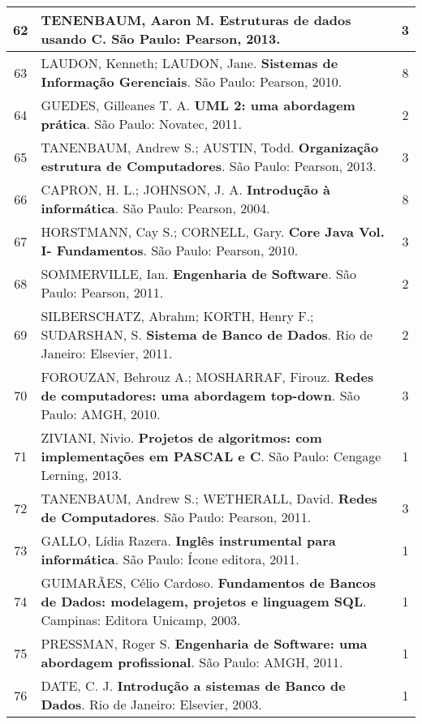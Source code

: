 \begin{longtable}{|c|p{115mm}|c|}
62     & TENENBAUM, Aaron M. \textbf{Estruturas de dados usando C}. São Paulo: Pearson, 2013.  & 3          \\ \hline
63     & LAUDON, Kenneth; LAUDON, Jane. \textbf{Sistemas de Informação Gerenciais}. São Paulo: Pearson, 2010. & 8 \\ \hline
64     & GUEDES, Gilleanes T. A. \textbf{UML 2: uma abordagem prática}. São Paulo: Novatec, 2011. & 2          \\ \hline
65     & TANENBAUM, Andrew S.; AUSTIN, Todd. \textbf{Organização estrutura de Computadores}. São Paulo: Pearson, 2013. & 3          \\ \hline
66     & CAPRON, H. L.; JOHNSON, J. A. \textbf{Introdução à informática}. São Paulo: Pearson, 2004.     & 8          \\ \hline
67     & HORSTMANN, Cay S.; CORNELL, Gary. \textbf{Core Java Vol. I- Fundamentos}. São Paulo: Pearson, 2010. & 3          \\ \hline
68     & SOMMERVILLE, Ian. \textbf{Engenharia de Software}. São Paulo: Pearson, 2011.                   & 2          \\ \hline
69     & SILBERSCHATZ, Abrahm; KORTH, Henry F.; SUDARSHAN, S. \textbf{Sistema de Banco de Dados}. Rio de Janeiro: Elsevier, 2011. & 2          \\ \hline
70     & FOROUZAN, Behrouz A.; MOSHARRAF, Firouz. \textbf{Redes de computadores: uma abordagem top-down}. São Paulo: AMGH, 2010. & 3          \\ \hline
71     & ZIVIANI, Nivio. \textbf{Projetos de algoritmos: com implementações em PASCAL e C}. São Paulo: Cengage Lerning, 2013. & 1          \\ \hline
72     & TANENBAUM, Andrew S.; WETHERALL, David. \textbf{Redes de Computadores}. São Paulo: Pearson, 2011. & 3          \\ \hline
73     & GALLO, Lídia Razera. \textbf{Inglês instrumental para informática}. São Paulo: Ícone editora, 2011. & 1          \\ \hline
74     & GUIMARÃES, Célio Cardoso. \textbf{Fundamentos de Bancos de Dados: modelagem, projetos e linguagem SQL}. Campinas: Editora Unicamp, 2003. & 1          \\ \hline
75     & PRESSMAN, Roger S. \textbf{Engenharia de Software: uma abordagem profissional}. São Paulo: AMGH, 2011. & 1          \\ \hline
76     & DATE, C. J. \textbf{Introdução a sistemas de Banco de Dados}. Rio de Janeiro: Elsevier, 2003.  & 1          \\ \hline

\end{longtable}
